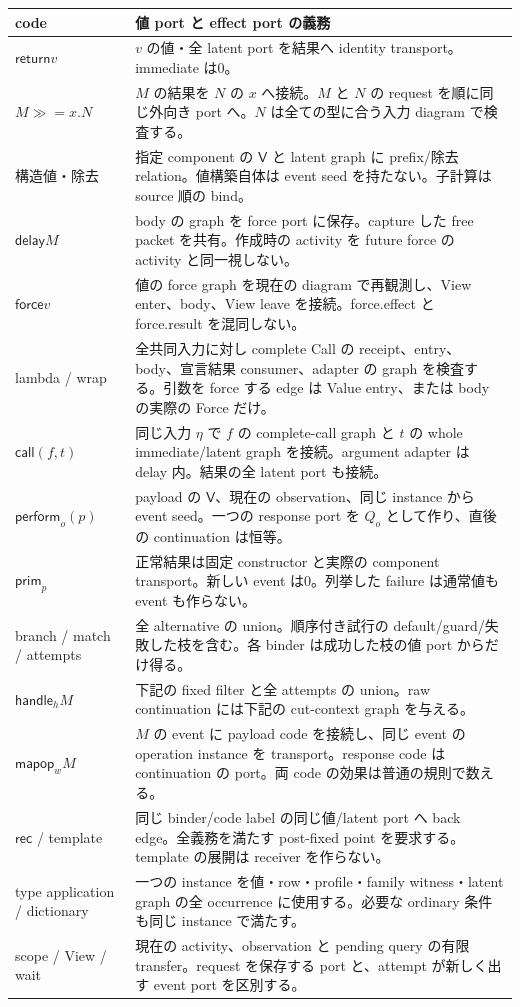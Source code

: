 \documentclass[11pt,a4paper]{article}
\newcommand{\Ret}{\mathsf{return}}
\newcommand{\Force}{\mathsf{force}}
\newcommand{\Call}{\mathsf{call}}
\newcommand{\Delay}{\mathsf{delay}}
\newcommand{\Handle}{\mathsf{handle}}
\newcommand{\bind}{\mathbin{\gg=}}
\begin{document}
\begin{longtable}{p{}p{}}
\toprule code & 値 port と effect port の義務 \\
\midrule\endhead
\(\Ret v\) & \(v\) の値・全 latent port を結果へ identity transport。immediate は0。\\
\(M\bind x.N\) & \(M\) の結果を \(N\) の \(x\) へ接続。\(M\) と \(N\) の request を順に同じ外向き port へ。\(N\) は全ての型に合う入力 diagram で検査する。\\
構造値・除去 & 指定 component の \(\mathsf V\) と latent graph に prefix/除去 relation。値構築自体は event seed を持たない。子計算は source 順の bind。\\
\(\Delay M\) & body の graph を force port に保存。capture した free packet を共有。作成時の activity を future force の activity と同一視しない。\\
\(\Force v\) & 値の force graph を現在の diagram で再観測し、View enter、body、View leave を接続。force.effect と force.result を混同しない。\\
lambda / wrap & 全共同入力に対し complete Call の receipt、entry、body、宣言結果 consumer、adapter の graph を検査する。引数を force する edge は Value entry、または body の実際の Force だけ。\\
\(\Call(f,t)\) & 同じ入力 \(\eta\) で \(f\) の complete-call graph と \(t\) の whole immediate/latent graph を接続。argument adapter は delay 内。結果の全 latent port も接続。\\
\(\mathsf{perform}_o(p)\) & payload の \(\mathsf V\)、現在の observation、同じ instance から event seed。一つの response port を \(Q_o\) として作り、直後の continuation は恒等。\\
\(\mathsf{prim}_p\) & 正常結果は固定 constructor と実際の component transport。新しい event は0。列挙した failure は通常値も event も作らない。\\
branch / match / attempts & 全 alternative の union。順序付き試行の default/guard/失敗した枝を含む。各 binder は成功した枝の値 port からだけ得る。\\
\(\Handle_h M\) & 下記の fixed filter と全 attempts の union。raw continuation には下記の cut-context graph を与える。\\
\(\mathsf{mapop}_w M\) & \(M\) の event に payload code を接続し、同じ event の operation instance を transport。response code は continuation の port。両 code の効果は普通の規則で数える。\\
\(\mathsf{rec}\) / template & 同じ binder/code label の同じ値/latent port へ back edge。全義務を満たす post-fixed point を要求する。template の展開は receiver を作らない。\\
type application / dictionary & 一つの instance を値・row・profile・family witness・latent graph の全 occurrence に使用する。必要な ordinary 条件も同じ instance で満たす。\\
scope / View / wait & 現在の activity、observation と pending query の有限 transfer。request を保存する port と、attempt が新しく出す event port を区別する。\\
\bottomrule
\end{longtable}
\end{document}
